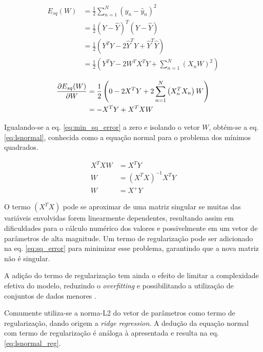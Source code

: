 \begin{equation}
\begin{split}
      E_{sq}(W) {}&= \frac{1}{2} \sum_{n = 1}^{N}\left(y_n-\hat{y}_n\right)^2 \\
      &= \frac{1}{2} (Y-\hat{Y})^T(Y-\hat{Y})\\
      &= \frac{1}{2} \left( Y^TY - 2 \hat{Y}^TY + \hat{Y}^T\hat{Y} \right)\\
      &= \frac{1}{2} \left( Y^TY - 2 W^TX^TY + \sum_{n = 1}^{N}\left(X_nW \right)^2 \right)
    \label{eq:sq_error}  
\end{split}
\end{equation}

\begin{equation}\begin{split}
    \pdv{E_{sq}(W)}{W} &= \frac{1}{2} \left( 0 - 2 X^TY + 2\sum_{n = 1}^{N}\left(X_n^TX_n \right)W  \right) \\
    &= - X^TY + X^TX W
    \label{eq:min_sq_error}
\end{split}\end{equation}

Igualando-se a eq. \ref{eq:min_sq_error} a zero e isolando o vetor $W$, obtém-se a eq. \ref{eq:lsnormal}, conhecida como a equação normal para o problema dos mínimos quadrados.

\begin{equation}\begin{split}
    X^TX W &= X^TY \\
    W &= (X^TX)^{-1}X^TY \\
    W &=X^+ Y
    \label{eq:lsnormal}
\end{split}\end{equation}

O termo $(X^TX)$ pode se aproximar de uma matriz singular se muitas das variáveis envolvidas forem linearmente dependentes, resultando assim em dificuldades para o cálculo numérico dos valores e possivelmente em um vetor de parâmetros de alta magnitude. Um termo de regularização pode ser adicionado na eq. \ref{eq:sq_error} 
para minimizar esse problema, garantindo que a nova matriz não é singular.

A adição do termo de regularização tem ainda o efeito de limitar a complexidade efetiva do modelo, reduzindo o \textit{overfitting} e possibilitando a utilização de conjuntos de dados menores \cite{bishop_2006}.

Comumente utiliza-se a norma-L2 do vetor de parâmetros como termo de regularização, dando origem a \textit{ridge regression}. A dedução da equação normal com termo de regularização é análoga à apresentada e resulta na eq. \ref{eq:lsnormal_reg}.

